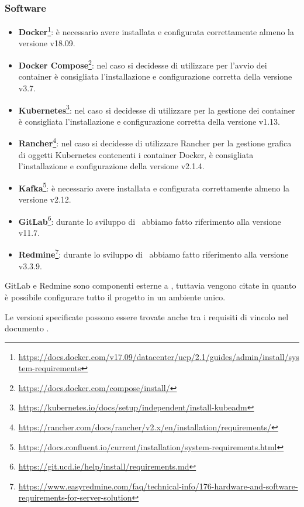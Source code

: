 	\subsubsection{Software}
		\begin{itemize}
			\item \textbf{Docker}\footnote{\url{https://docs.docker.com/v17.09/datacenter/ucp/2.1/guides/admin/install/system-requirements}}: è necessario avere installata e configurata correttamente almeno la versione v18.09.
			\item \textbf{Docker Compose}\footnote{\url{https://docs.docker.com/compose/install/}}:  nel caso si decidesse di utilizzare  per l'avvio dei container è consigliata l'installazione e configurazione corretta della versione v3.7.
			\item \textbf{Kubernetes}\footnote{\url{https://kubernetes.io/docs/setup/independent/install-kubeadm}}: nel caso si decidesse di utilizzare  per la gestione dei container è consigliata l'installazione e configurazione corretta della versione v1.13.
			\item \textbf{Rancher}\footnote{\url{https://rancher.com/docs/rancher/v2.x/en/installation/requirements/}}: nel caso si decidesse di utilizzare Rancher per la gestione grafica di oggetti Kubernetes contenenti i container Docker, è consigliata l'installazione e configurazione della versione v2.1.4.
			\item \textbf{Kafka}\footnote{\url{https://docs.confluent.io/current/installation/system-requirements.html}}: è necessario avere installata e configurata correttamente almeno la versione v2.12.
			\item \textbf{GitLab}\footnote{\url{https://git.ucd.ie/help/install/requirements.md}}: durante lo sviluppo di \progetto~abbiamo fatto riferimento alla versione v11.7.
			\item \textbf{Redmine}\footnote{%
			\url{https://www.easyredmine.com/faq/technical-info/176-hardware-and-software-requirements-for-server-solution}}: durante lo sviluppo di \progetto~abbiamo fatto riferimento alla versione v3.3.9.
		\end{itemize}

	GitLab e Redmine sono componenti esterne a \progetto, tuttavia vengono citate in quanto è possibile configurare tutto il progetto in un ambiente unico.\par
	Le versioni specificate possono essere trovate anche tra i requisiti di vincolo nel documento \AdRd.


